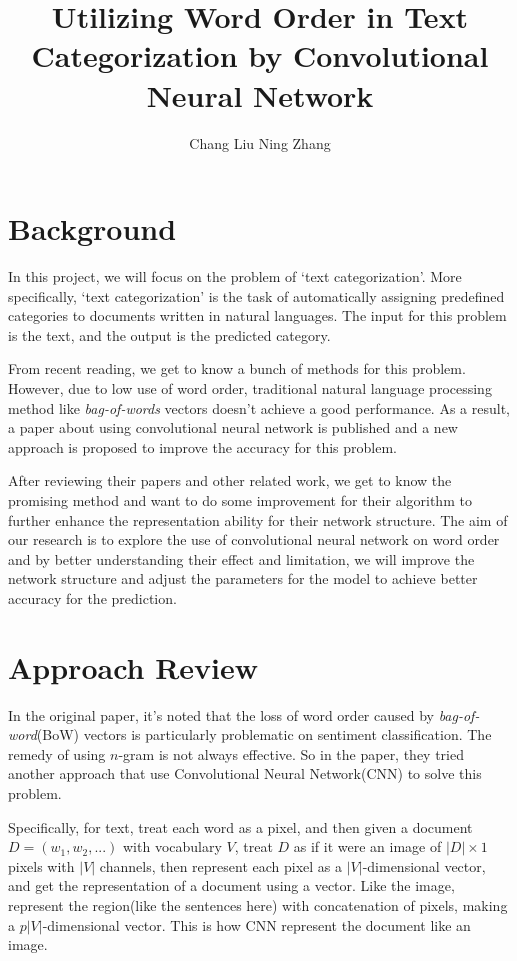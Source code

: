 \documentclass{article}
\title{Utilizing Word Order in Text Categorization by Convolutional Neural Network}
\author{Chang Liu \space Ning Zhang}
\begin{document}
\maketitle

\section{Background}
In this project, we will focus on the problem of `text categorization'. More specifically, `text categorization' is the task of automatically assigning predefined categories to documents written in natural languages. The input for this problem is the text, and the output is the predicted category.

From recent reading, we get to know a bunch of methods for this problem. However, due to low use of word order, traditional natural language processing method like \textit{bag-of-words} vectors doesn't achieve a good performance. As a result, a paper about using convolutional neural network is published and a new approach is proposed to improve the accuracy for this problem.

After reviewing their papers and other related work, we get to know the promising method and want to do some improvement for their algorithm to further enhance the representation ability for their network structure. The aim of our research is to explore the use of convolutional neural network on word order and by better understanding their effect and limitation, we will improve the network structure and adjust the parameters for the model to achieve better accuracy for the prediction.

\section{Approach Review}

In the original paper, it's noted that the loss of word order caused by \textit{bag-of-word}(BoW) vectors is particularly problematic on sentiment classification. The remedy of using $n$-gram is not always effective. So in the paper, they tried another approach that use Convolutional Neural Network(CNN) to solve this problem.

Specifically, for text, treat each word as a pixel, and then given a document $D=(w_1, w_2, . . .)$ with vocabulary $V$, treat $D$ as if it were an image of $|D| \times 1$ pixels with $|V|$ channels, then represent each pixel as a $|V|$-dimensional vector, and get the representation of a document using a vector. Like the image, represent the region(like the sentences here) with concatenation of pixels, making a $p|V|$-dimensional vector. This is how CNN represent the document like an image. 
\end{document}
